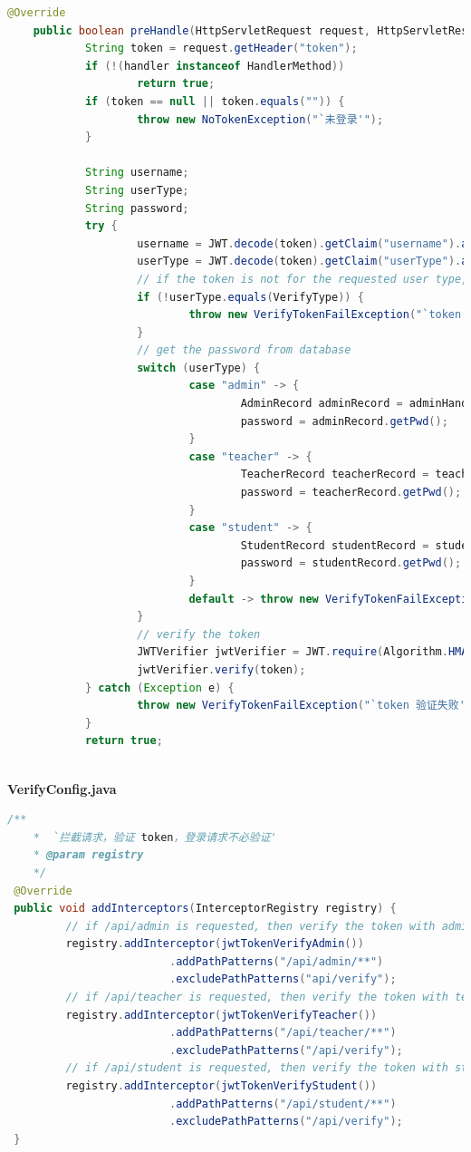 \documentclass[12pt, a4paper]{article}
\begin{document}
\begin{lstlisting}[language=Java]
	@Override
	public boolean preHandle(HttpServletRequest request, HttpServletResponse response, Object handler) {
			String token = request.getHeader("token");
			if (!(handler instanceof HandlerMethod))
					return true;
			if (token == null || token.equals("")) {
					throw new NoTokenException("`未登录'");
			}

			String username;
			String userType;
			String password;
			try {
					username = JWT.decode(token).getClaim("username").asString();
					userType = JWT.decode(token).getClaim("userType").asString();
					// if the token is not for the requested user type, then throw exception
					if (!userType.equals(VerifyType)) {
							throw new VerifyTokenFailException("`token 验证失败'");
					}
					// get the password from database
					switch (userType) {
							case "admin" -> {
									AdminRecord adminRecord = adminHandler.getAdmin(username);
									password = adminRecord.getPwd();
							}
							case "teacher" -> {
									TeacherRecord teacherRecord = teacherHandler.getTeacher(username);
									password = teacherRecord.getPwd();
							}
							case "student" -> {
									StudentRecord studentRecord = studentHandler.getStudent(username);
									password = studentRecord.getPwd();
							}
							default -> throw new VerifyTokenFailException("`token 验证失败'");
					}
					// verify the token
					JWTVerifier jwtVerifier = JWT.require(Algorithm.HMAC256(password)).build();
					jwtVerifier.verify(token);
			} catch (Exception e) {
					throw new VerifyTokenFailException("`token 验证失败'");
			}							
			return true;
	
\end{lstlisting}
\textbf{VerifyConfig.java}
\begin{lstlisting}[language=Java]
	/**
	*  `拦截请求，验证 token，登录请求不必验证'
	* @param registry
	*/
 @Override
 public void addInterceptors(InterceptorRegistry registry) {
		 // if /api/admin is requested, then verify the token with admin role
		 registry.addInterceptor(jwtTokenVerifyAdmin())
						 .addPathPatterns("/api/admin/**")
						 .excludePathPatterns("api/verify");
		 // if /api/teacher is requested, then verify the token with teacher role
		 registry.addInterceptor(jwtTokenVerifyTeacher())
						 .addPathPatterns("/api/teacher/**")
						 .excludePathPatterns("/api/verify");
		 // if /api/student is requested, then verify the token with student role
		 registry.addInterceptor(jwtTokenVerifyStudent())
						 .addPathPatterns("/api/student/**")
						 .excludePathPatterns("/api/verify");
 }
\end{lstlisting}
\end{document}
